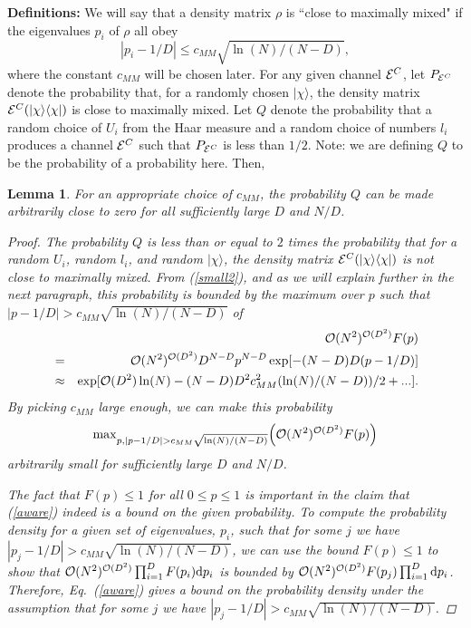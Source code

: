 \documentclass[aps,prl,amsmath,amssymb,amsfonts,superscriptaddress,floatfix]{revtex4}
\newtheorem{lemma}{Lemma}
\newcommand{\cmm}{c_{MM}}
\newcommand{\conc}{{\cal E}^C}
\newcommand{\be}{\begin{equation}}
\newcommand{\ee}{\end{equation}}
\newcommand{\FF}{F}
\begin{document}
{\bf Definitions:}
We will
 say that a density matrix $\rho$ is ``close to maximally mixed"
if the eigenvalues 
$p_i$ of $\rho$ all
obey 
\be
|p_i-1/D|\leq \cmm \sqrt{\ln(N)/(N-D)},
\ee
where the constant $\cmm$ will be chosen later.
For any given channel $\conc$, let $P_{\conc}$ denote the probability that,
for a randomly chosen $|\chi\rangle$,
the density matrix $\conc(|\chi\rangle\langle\chi|)$ is close to maximally mixed.
Let $Q$ denote the probability that a random choice of $U_i$ from the Haar measure and
a random choice of numbers $l_i$ produces a channel $\conc$
such that $P_{\conc}$ is less than $1/2$.  Note: we are defining $Q$ to be the
probability of a probability here.
Then,
\begin{lemma}
For an appropriate choice of $\cmm$, the probability $Q$ can be
made arbitrarily close to zero
for all sufficiently large $D$ and $N/D$.
\begin{proof}
The probability $Q$ is less than or equal to $2$ times the probability that for
a random $U_i$, random $l_i$, and random $|\chi\rangle$, the
density matrix ${\conc}(|\chi\rangle\langle\chi|)$ is not close to maximally mixed.
From (\ref{small2}), and as we will explain further in the next
paragraph, this probability is bounded by the maximum over
$p$ such that $|p-1/D|>\cmm \sqrt{\ln(N)/(N-D)}$ of
\begin{eqnarray}
\label{taware}
&&{\cal O}(N^2)^{{\cal O}(D^2)} \FF(p) \\ \nonumber
&=&{\cal O}(N^2)^{{\cal O}(D^2)}
D^{N-D} p^{N-D} \exp[-(N-D)D(p-1/D)] \\ \nonumber
&\approx &\exp[{\cal O}(D^2) \ln(N)-(N-D)D^2
\cmm^2 (\ln(N)/(N-D))/2+...].
\end{eqnarray}
By picking $\cmm$ large
enough, we can make this probability
\be
\label{aware}
{\rm max}_{p,|p-1/D|>\cmm \sqrt{\ln(N)/(N-D)}}
\Bigl({\cal O}(N^2)^{{\cal O}(D^2)} \FF(p)\Bigr)
\ee
 arbitrarily small for sufficiently
large $D$ and $N/D$.

The fact that $\FF(p)\leq 1$ for all $0\leq p \leq 1$ is important in the
claim that (\ref{aware}) indeed is a bound on the given probability.
To compute the probability density for a given set of
eigenvalues, $p_i$, such that for some $j$ we have $|p_j-1/D|>\cmm \sqrt{\ln(N)/(N-D)}$,
we can use the bound $\FF(p)\leq 1$ to show that
${\cal O}(N^2)^{{\cal O}(D^2)} \prod_{i=1}^D \FF(p_i) {\rm d}p_i$ is bounded
by 
${\cal O}(N^2)^{{\cal O}(D^2)} \FF(p_j) \prod_{i=1}^D {\rm d}p_i$.
Therefore,
Eq.~(\ref{aware}) gives a bound on the probability {\it density}
under the assumption that for some $j$ we have $|p_j-1/D|>\cmm \sqrt{\ln(N)/(N-D)}$.


\end{proof}
\end{lemma}
\end{document}
